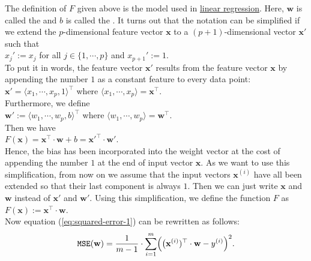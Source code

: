 The definition of $F$ given above is the model used in
\href{https://en.wikipedia.org/wiki/Linear_regression}{linear regression}. 
Here, $\mathbf{w}$ is called the  and $b$ is called the .  It turns
out that the notation can be simplified if we extend the $p$-dimensional feature vector $\mathbf{x}$ to a
$(p+1)$-dimensional vector $\mathbf{x}'$ such that
\\[0.2cm]
\hspace*{1.3cm}
$x_j' := x_j$ \quad for all $j\in\{1,\cdots,p\}$ \quad and \quad $x_{p+1}' := 1$.
\\[0.2cm]
To put it in words, the feature vector $\mathbf{x}'$ results from the feature vector $\mathbf{x}$ by appending
the number $1$ as a constant feature to every data point:
\\[0.2cm]
\hspace*{1.3cm}
$\mathbf{x}' = \langle x_1, \cdots, x_p, 1 \rangle^\top$ \quad where $\langle x_1, \cdots, x_p \rangle = \mathbf{x}^\top$.
\\[0.2cm]
Furthermore, we define 
\\[0.2cm]
\hspace*{1.3cm}
$\mathbf{w}' := \langle w_1, \cdots, w_p, b \rangle^\top$ \quad where $\langle w_1, \cdots, w_p \rangle = \mathbf{w}^\top$.
\\[0.2cm]
Then we have
\\[0.2cm]
\hspace*{1.3cm}
$F(\mathbf{x}) = \mathbf{x}^\top \cdot \mathbf{w} + b = \mathbf{x}'^\top \cdot \mathbf{w}'$.
\\[0.2cm]
Hence, the bias has been incorporated into the weight vector at the cost of appending the number $1$ at the end of
input vector $\mathbf{x}$.  As we want to use this simplification, from now on we assume that the input vectors
$\mathbf{x}^{(i)}$ have all been extended so that their last component is always $1$.  Then we can just write
$\mathbf{x}$ and $\mathbf{w}$ instead of $\mathbf{x}'$ and $\mathbf{w}'$.  Using this simplification,  we define the
function $F$ as
\\[0.2cm]
\hspace*{1.3cm}
$F(\mathbf{x}) := \mathbf{x}^\top \cdot \mathbf{w}$.
\\[0.2cm]
Now equation (\ref{eq:squared-error-1}) can be rewritten as follows:
\begin{equation}
  \label{eq:squared-error-2}
  \mathtt{MSE}(\mathbf{w}) = \frac{1}{m-1} \cdot \sum\limits_{i=1}^m \Bigl(\bigl(\mathbf{x}^{(i)})^\top \cdot \mathbf{w}  - y^{(i)}\Bigr)^2.
\end{equation}
